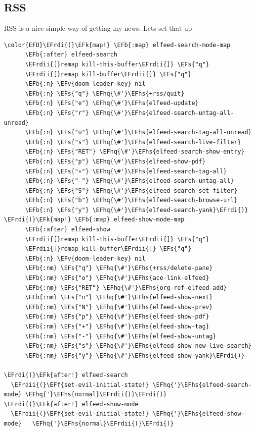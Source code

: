 \documentclass{scrartcl}
\newcommand{\EFk}[1]{\textcolor{EFk}{#1}} %
\newcommand{\EFs}[1]{\textcolor{EFs}{#1}} %
\newcommand{\EFb}[1]{\textcolor{EFb}{#1}} %
\newcommand{\EFv}[1]{\textcolor{EFv}{#1}} %
\newcommand{\EFf}[1]{\textcolor{EFf}{#1}} %
\newcommand{\EFhq}[1]{\textcolor{EFhq}{#1}} %
\newcommand{\EFhs}[1]{\textcolor{EFhs}{#1}} %
\newcommand{\EFrdi}[1]{\textcolor{EFrdi}{#1}} %
\newcommand{\EFrdii}[1]{\textcolor{EFrdii}{#1}} %
\begin{document}
\subsection{RSS}
\label{sec:org70115da}
RSS is a nice simple way of getting my news. Lets set that up
\begin{Code}
\begin{Verbatim}[]
\color{EFD}\EFrdi{(}\EFk{map!} \EFb{:map} elfeed-search-mode-map
      \EFb{:after} elfeed-search
      \EFrdii{[}remap kill-this-buffer\EFrdii{]} \EFs{"q"}
      \EFrdii{[}remap kill-buffer\EFrdii{]} \EFs{"q"}
      \EFb{:n} \EFv{doom-leader-key} nil
      \EFb{:n} \EFs{"q"} \EFhq{\#'}\EFhs{+rss/quit}
      \EFb{:n} \EFs{"e"} \EFhq{\#'}\EFhs{elfeed-update}
      \EFb{:n} \EFs{"r"} \EFhq{\#'}\EFhs{elfeed-search-untag-all-unread}
      \EFb{:n} \EFs{"u"} \EFhq{\#'}\EFhs{elfeed-search-tag-all-unread}
      \EFb{:n} \EFs{"s"} \EFhq{\#'}\EFhs{elfeed-search-live-filter}
      \EFb{:n} \EFs{"RET"} \EFhq{\#'}\EFhs{elfeed-search-show-entry}
      \EFb{:n} \EFs{"p"} \EFhq{\#'}\EFhs{elfeed-show-pdf}
      \EFb{:n} \EFs{"+"} \EFhq{\#'}\EFhs{elfeed-search-tag-all}
      \EFb{:n} \EFs{"-"} \EFhq{\#'}\EFhs{elfeed-search-untag-all}
      \EFb{:n} \EFs{"S"} \EFhq{\#'}\EFhs{elfeed-search-set-filter}
      \EFb{:n} \EFs{"b"} \EFhq{\#'}\EFhs{elfeed-search-browse-url}
      \EFb{:n} \EFs{"y"} \EFhq{\#'}\EFhs{elfeed-search-yank}\EFrdi{)}
\EFrdi{(}\EFk{map!} \EFb{:map} elfeed-show-mode-map
      \EFb{:after} elfeed-show
      \EFrdii{[}remap kill-this-buffer\EFrdii{]} \EFs{"q"}
      \EFrdii{[}remap kill-buffer\EFrdii{]} \EFs{"q"}
      \EFb{:n} \EFv{doom-leader-key} nil
      \EFb{:nm} \EFs{"q"} \EFhq{\#'}\EFhs{+rss/delete-pane}
      \EFb{:nm} \EFs{"o"} \EFhq{\#'}\EFhs{ace-link-elfeed}
      \EFb{:nm} \EFs{"RET"} \EFhq{\#'}\EFhs{org-ref-elfeed-add}
      \EFb{:nm} \EFs{"n"} \EFhq{\#'}\EFhs{elfeed-show-next}
      \EFb{:nm} \EFs{"N"} \EFhq{\#'}\EFhs{elfeed-show-prev}
      \EFb{:nm} \EFs{"p"} \EFhq{\#'}\EFhs{elfeed-show-pdf}
      \EFb{:nm} \EFs{"+"} \EFhq{\#'}\EFhs{elfeed-show-tag}
      \EFb{:nm} \EFs{"-"} \EFhq{\#'}\EFhs{elfeed-show-untag}
      \EFb{:nm} \EFs{"s"} \EFhq{\#'}\EFhs{elfeed-show-new-live-search}
      \EFb{:nm} \EFs{"y"} \EFhq{\#'}\EFhs{elfeed-show-yank}\EFrdi{)}

\EFrdi{(}\EFk{after!} elfeed-search
  \EFrdii{(}\EFf{set-evil-initial-state!} \EFhq{'}\EFhs{elfeed-search-mode} \EFhq{'}\EFhs{normal}\EFrdii{)}\EFrdi{)}
\EFrdi{(}\EFk{after!} elfeed-show-mode
  \EFrdii{(}\EFf{set-evil-initial-state!} \EFhq{'}\EFhs{elfeed-show-mode}   \EFhq{'}\EFhs{normal}\EFrdii{)}\EFrdi{)}


\end{Verbatim}
\end{Code}
\end{document}
